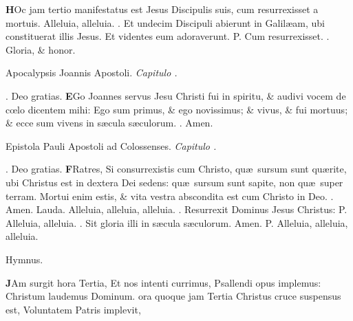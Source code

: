 \documentclass[letter,11pt]{book}
\makeatletter
\DeclareRobustCommand{\Vbar}{\vers@resp{-0.1em}{V}}
\DeclareRobustCommand{\Rbar}{\vers@resp{0pt}{R}}
\newcommand{\vers@resp@sym}{\raisebox{0.2ex}{\rotatebox[origin=c]{-20}{$\m@th\rceil$}}}
\newcommand{\vers@resp}[2]{%
  {\ooalign{\hidewidth\kern#1\vers@resp@sym\hidewidth\cr#2\cr}}%
}%
\def\P{\color{Red} P. \color{black}}
\def\V{\color{Red} \Vbar . \color{black}}
\def\R{\color{Red} \Rbar . \color{black}}
\makeatother
\begin{document}
\begin{multicols*}{2}
\lettrine[lines=2]{\bfseries \color{Red} H}{}Oc jam tertio manifestatus est Jesus Discipulis suis, cum resurrexisset a mortuis. Alleluia, alleluia. \V Et undecim Discipuli abierunt in Galil\ae am, ubi constituerat illis Jesus. Et videntes eum adoraverunt. \P Cum resurrexisset. \V Gloria, \& honor.
\vspace{-.5em} \begin{center} {\color{Red} A}pocalypsis Joannis Apostoli. \itshape Capitulo . \end{center} \vspace{-.5em}
\par \noindent \R Deo gratias.
\lettrine[lines=2]{\bfseries \color{Red} E}{}Go Joannes servus Jesu Christi fui in spiritu, \& audivi vocem de c\oe lo dicentem mihi: Ego sum primus, \& ego novissimus; \& vivus, \& fui mortuus; \& ecce sum vivens in s\ae cula s\ae culorum. \R Amen.
\vspace{-1.5em} \begin{center} {\color{Red} E}pistola Pauli Apostoli ad Colossenses. \itshape Capitulo . \end{center} \vspace{-.5em}
\par \noindent \R Deo gratias.
\lettrine[lines=2]{\bfseries \color{Red} F}{}Ratres, Si consurrexistis cum Christo, qu\ae \ sursum sunt qu\ae rite, ubi Christus est in dextera Dei sedens: qu\ae \ sursum sunt sapite, non qu\ae \ super terram. Mortui enim estis, \& vita vestra abscondita est cum Christo in Deo. \R Amen.
\newline \color{Red} Lauda. \color{black} Alleluia, alleluia, alleluia. \V Resurrexit Dominus Jesus Christus: \P Alleluia, alleluia. \V Sit gloria illi in s\ae cula s\ae culorum. Amen. \P Alleluia, alleluia, alleluia.
\vspace{-.5em} \begin{center} \color{Red} Hymnus. \end{center} \vspace{-.5em}
\lettrine[lines=2]{\bfseries \color{Red} J}{}Am surgit hora Tertia,
\newline Et nos intenti currimus,
\newline \indent Psallendi opus implemus:
\newline \indent Christum laudemus Dominum.
ora quoque jam Tertia
\newline \indent Christus cruce suspensus est,
\newline \indent Voluntatem Patris implevit,

\end{multicols*}
\end{document}
